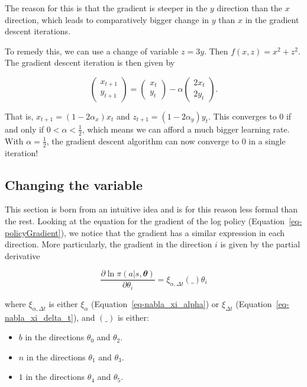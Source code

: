 \documentclass[
  letterpaper,
]{report}
\providecommand{\tightlist}{%
  \setlength{\itemsep}{0pt}\setlength{\parskip}{0pt}}\usepackage{longtable,booktabs,array}
\theoremstyle{plain}
\theoremstyle{definition}
\theoremstyle{definition}
\theoremstyle{remark}
\begin{document}
The reason for this is that the gradient is steeper in the \(y\)
direction than the \(x\) direction, which leads to comparatively bigger
change in \(y\) than \(x\) in the gradient descent iterations.

To remedy this, we can use a change of variable \(z = 3y\). Then
\(f(x,z) = x^2 + z^2\). The gradient descent iteration is then given by

\[
\begin{pmatrix}
x_{t+1}\\
y_{t+1}
\end{pmatrix} = \begin{pmatrix}
x_t\\
y_t
\end{pmatrix} - \alpha 
\begin{pmatrix}
2x_t\\
2y_t
\end{pmatrix}.
\]

That is, \(x_{t+1} = (1-2\alpha_x)x_t\) and
\(z_{t+1} = (1-2\alpha_y)y_t\). This converges to \(0\) if and only if
\(0<\alpha<\frac{1}{2}\), which means we can afford a much bigger
learning rate. With \(\alpha = \frac{1}{2}\), the gradient descent
algorithm can now converge to \(0\) in a single iteration!

\hypertarget{changing-the-variable}{%
\subsection{Changing the variable}\label{changing-the-variable}}

This section is born from an intuitive idea and is for this reason less
formal than the rest. Looking at the equation for the gradient of the
log policy (Equation~\ref{eq-policyGradient}), we notice that the
gradient has a similar expression in each direction. More particularly,
the gradient in the direction \(i\) is given by the partial derivative

\[
\frac{\partial \ln \pi(a|s,\mathbfit{\theta})}{\partial \theta_i} = \xi_{\alpha,\Delta t} (\_) \theta_i
\]

where \(\xi_{\alpha,\Delta t}\) is either \(\xi_\alpha\)
(Equation~\ref{eq-nabla_xi_alpha}) or \(\xi_{\Delta t}\)
(Equation~\ref{eq-nabla_xi_delta_t}), and \((\_)\) is either:

\begin{itemize}
\tightlist
\item
  \(b\) in the directions \(\theta_0\) and \(\theta_2\).
\item
  \(n\) in the directions \(\theta_1\) and \(\theta_3\).
\item
  \(1\) in the directions \(\theta_4\) and \(\theta_5\).
\end{itemize}
\end{document}
